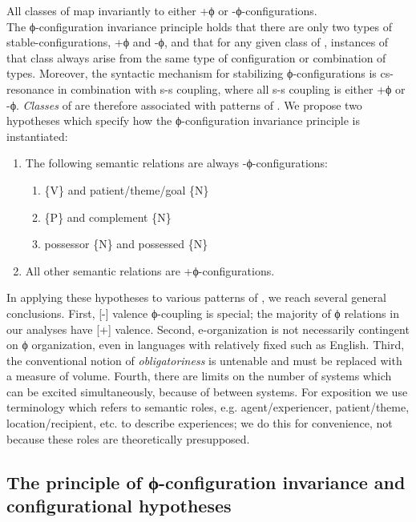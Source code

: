   All classes of  map invariantly to either +ϕ or -ϕ-configurations. \\

  The ϕ-configuration invariance principle holds that there are only two types of stable-configurations, +ϕ and -ϕ, and that for any given class of , instances of that class always arise from the same type of configuration or combination of types. Moreover, the syntactic mechanism for stabilizing ϕ-configurations is cs-resonance in combination with s-s coupling, where all s-s coupling is either +ϕ or -ϕ. \textit{Classes} of  are therefore associated with patterns of . We propose two hypotheses which specify how the ϕ-configuration invariance principle is instantiated:
  
\begin{enumerate}
\item The following semantic relations are always -ϕ-configurations:
\begin{enumerate}
  \item \{V\} and patient/theme/goal \{N\}
  \item {} \{P\} and complement \{N\}
  \item possessor \{N\} and possessed \{N\}
\end{enumerate}
\item  All other semantic relations are +ϕ-configurations.
\end{enumerate}

  In applying these hypotheses to various patterns of , we reach several general conclusions. First, [-] valence ϕ-coupling is special; the majority of ϕ relations in our analyses have [+] valence. Second, e-organization is not necessarily contingent on ϕ organization, even in languages with relatively fixed  such as English. Third, the conventional notion of \textit{obligatoriness} is untenable and must be replaced with a measure of  volume. Fourth, there are limits on the number of systems which can be excited simultaneously, because of  between systems. For exposition we use terminology which refers to semantic roles, e.g. agent/experiencer, patient/theme, location/recipient, etc. to describe  experiences; we do this for convenience, not because these roles are theoretically presupposed.

\subsection{The principle of \textup{ϕ-configuration} invariance and configurational hypotheses}

